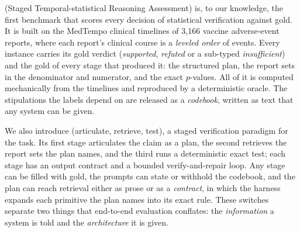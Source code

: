 \sys{} (Staged Temporal-statistical Reasoning Assessment) is, to our
knowledge, the first benchmark that scores every decision of statistical
verification against gold. It is built on the MedTempo clinical
timelines \cite{craft2026} of 3{,}166 vaccine adverse-event reports, where
each report's clinical course is a \emph{leveled order} of events. Every
instance carries its gold verdict (\emph{supported}, \emph{refuted} or a
sub-typed \emph{insufficient}) and the gold of every stage that produced it:
the structured plan, the report sets in the denominator and numerator, and
the exact $p$-values. All of it is computed mechanically from the timelines
and reproduced by a deterministic oracle. The stipulations the labels depend
on are released as a \emph{codebook}, written as text that any system can be
given.

We also introduce \art{} (articulate, retrieve, test), a staged
verification paradigm for the task. Its first stage articulates the claim as a
plan, the second retrieves the report sets the plan names, and the third
runs a deterministic exact test; each stage has an output contract and a
bounded verify-and-repair loop. Any stage can be filled with gold, the
prompts can state or withhold the codebook, and the plan can reach retrieval
either as prose or as a \emph{contract}, in which the harness expands each
primitive the plan names into its exact rule. These switches separate two
things that end-to-end evaluation conflates: the \emph{information} a system
is told and the \emph{architecture} it is given.

